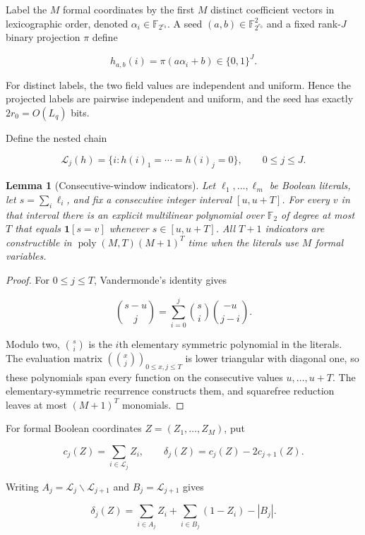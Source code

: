 \documentclass[11pt,letterpaper]{article}
\newtheorem{lemma}[theorem]{Lemma}
\theoremstyle{definition}
\theoremstyle{remark}
\begin{document}
Label the \(M\) formal coordinates by the first \(M\) distinct
coefficient vectors in lexicographic order, denoted
\(\alpha_i\in\mathbb F_{2^{r_0}}\). A seed
\((a,b)\in\mathbb F_{2^{r_0}}^2\) and a fixed rank-\(J\) binary
projection \(\pi\) define

\[
h_{a,b}(i)
{}={}
\pi(a\alpha_i+b)
\in
\{0,1\}^J.
\]

For distinct labels, the two field values are independent and uniform.
Hence the projected labels are pairwise independent and uniform, and the
seed has exactly \(2r_0=O(L_q)\) bits.

Define the nested chain

\[
\mathcal L_j(h)
{}={}
\{i:h(i)_1=\cdots=h(i)_j=0\},
\qquad
0\le j\le J.
\]

\begin{lemma}[Consecutive-window indicators]
\label{lem:window-indicators}
Let
\(\ell_1,\ldots,\ell_m\) be Boolean literals, let \(s=\sum_i\ell_i\),
and fix a consecutive integer interval \([u,u+T]\). For every \(v\) in
that interval there is an explicit multilinear polynomial over
\(\mathbb F_2\) of degree at most \(T\) that equals \(\mathbf1[s=v]\)
whenever \(s\in[u,u+T]\). All \(T+1\) indicators are constructible in
\(\operatorname{poly}(M,T)(M+1)^T\) time when the literals use \(M\)
formal variables.
\end{lemma}

\begin{proof} For \(0\le j\le T\), Vandermonde's
identity gives

\[
\binom{s-u}{j}
{}={}
\sum_{i=0}^j
\binom si
\binom{-u}{j-i}.
\]

Modulo two, \(\binom si\) is the \(i\)th elementary symmetric polynomial
in the literals. The evaluation matrix
\((\binom{x}{j})_{0\le x,j\le T}\) is lower triangular with diagonal
one, so these polynomials span every function on the consecutive values
\(u,\ldots,u+T\). The elementary-symmetric recurrence constructs them,
and squarefree reduction leaves at most \((M+1)^T\) monomials.
\end{proof}

For formal Boolean coordinates \(Z=(Z_1,\ldots,Z_M)\), put

\[
c_j(Z)=\sum_{i\in \mathcal L_j}Z_i,
\qquad
\delta_j(Z)=c_j(Z)-2c_{j+1}(Z).
\]

Writing \(A_j=\mathcal L_j\smallsetminus \mathcal L_{j+1}\) and
\(B_j=\mathcal L_{j+1}\) gives

\[
\delta_j(Z)
{}={}
\sum_{i\in A_j}Z_i
{}+{}
\sum_{i\in B_j}(1-Z_i)
-|B_j|.
\]
\end{document}
